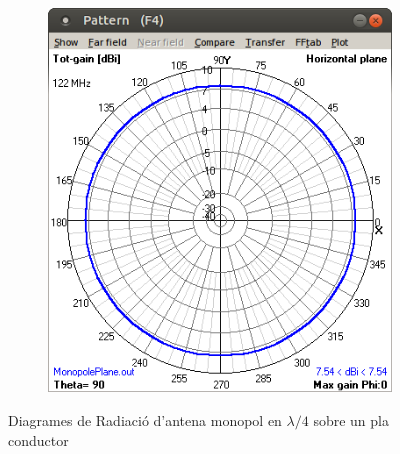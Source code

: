 \begin{figure}[H]
\begin{subfigure}[b]{0.32\textwidth}
	  \includegraphics[width=\textwidth]{./images/4.Monopole_plane/horizontal.png}
	  \caption{}
	  \label{2diag2}
	  \end{subfigure}
	  \vspace{10pt}
	\caption{Diagrames de Radiació d'antena monopol en $\lambda/4$ sobre un pla conductor}
	\label{diag3}
	\end{figure}


